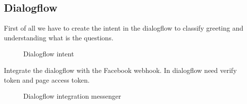 \documentclass[12pt,oneside,openright,a4paper]{cpe-english-project}
\begin{document}
	\subsection{Dialogflow}
		\begin{flushleft}
			First of all we have to create the intent in the dialogflow to classify greeting and understanding what is the questions.
		\end{flushleft}
		\begin{figure}[!h]\centering
			\caption{Dialogflow intent}\label{fig:Dialogflow intent}
		\end{figure}
\pagebreak
		\begin{flushleft}
			Integrate the dialogflow with the Facebook webhook. In dialogflow need verify token and page access token.
		\end{flushleft}
		\begin{figure}[!h]\centering
			\caption{Dialogflow integration messenger}\label{fig:Dialogflow integration messenger}
		\end{figure}
\end{document}
